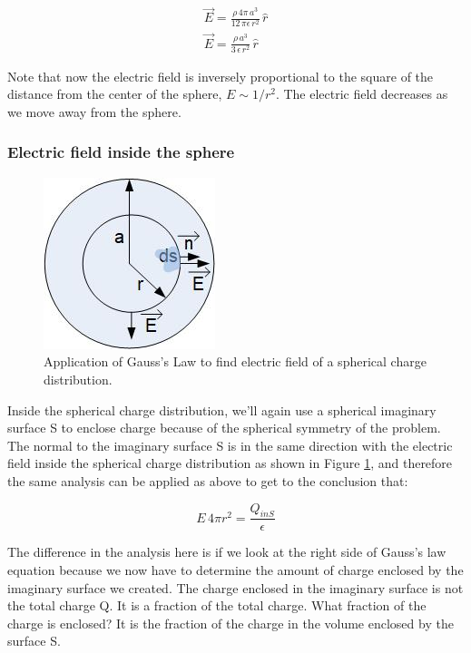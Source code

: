 \documentclass{ximera}
\begin{document}
\begin{eqnarray}
 \vec{E}  = \frac{\rho \, 4 \pi \, a^3}{12 \, \pi  \epsilon \, r^2} \, \hat{r} \\
 \vec{E}  = \frac{\rho \,   a^3}{3  \, \epsilon \, r^2} \, \hat{r}
\end{eqnarray}


Note that now the electric field is inversely proportional to the square of the distance from the center of the sphere, $E \sim 1/r^2$. The electric field decreases as we move away from the sphere.

\subsubsection{Electric field inside the sphere}




\begin{figure}[htbp]
\begin{center}
\includegraphics[scale=1]{../jpg/gaussSphereIn.jpg}
\end{center}
\caption{Application of Gauss's Law to find electric field of a spherical charge distribution.}
\label{fig:gaussSphereIn}
\end{figure}

Inside the spherical charge distribution, we'll again use a spherical imaginary surface  S to enclose charge because of the spherical symmetry of the problem. The normal to the imaginary surface S is in the same direction with the electric field inside the spherical charge distribution as shown in Figure \ref{fig:gaussSphereIn}, and therefore the same analysis can be applied as above to get to the conclusion that:



\begin{equation}
 E \, 4 \pi r^2 = \frac{Q_{inS}}{\epsilon}
\end{equation}




The difference in the analysis here is if we look at the right side of Gauss's law equation because we now have to determine the amount of charge enclosed by the imaginary surface we created. The charge enclosed in the imaginary surface is not the total charge Q. It is a fraction of the total charge. What fraction of the charge is enclosed? It is the fraction of the charge in the volume enclosed by the surface S. 
\end{document}
